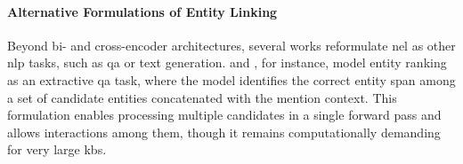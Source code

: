 



\paragraph{Alternative Formulations of Entity Linking}

Beyond bi- and cross-encoder architectures, several works reformulate \ac{nel} as other \ac{nlp} tasks, such as \acl{qa} or text generation.
\textcite{procopio-etal-2023-entity} and \textcite{barba-etal-2022-extend}, for instance, model entity ranking as an extractive \ac{qa} task, where the model identifies the correct entity span among a set of candidate entities concatenated with the mention context. This formulation enables processing multiple candidates in a single forward pass and allows interactions among them, though it remains computationally demanding for very large \acp{kb}.


